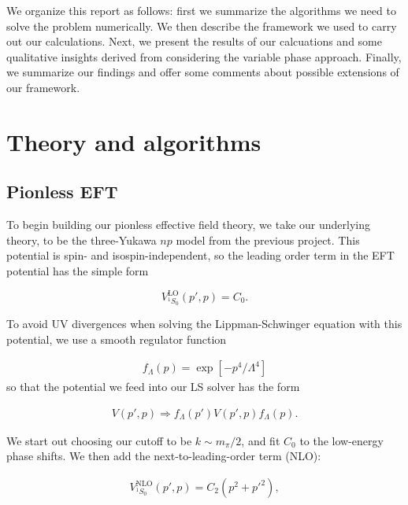 \documentclass[10pt,showpacs,preprintnumbers,footinbib,amsmath,amssymb,aps,prl,twocolumn,groupedaddress,superscriptaddress,showkeys]{revtex4-1}
\begin{document}
We organize this report as follows: first we summarize the algorithms we need to solve the
problem numerically. We then describe the framework we used to carry out our calculations.
Next, we present the results of our calcuations and some qualitative insights derived from
considering the variable phase approach. Finally, we summarize our findings and offer some
comments about possible extensions of our framework.



\section{Theory and algorithms}\label{sec:theory}

\subsection{Pionless EFT}

To begin building our pionless effective field theory, we take our underlying theory, to be
the three-Yukawa $np$ model from the previous project. This potential is spin- and
isospin-independent, so the leading order term in the EFT potential has the simple form

\begin{equation}
	V^\mathrm{LO}_{^1S_0}(p',p)=C_0.
\end{equation}

To avoid UV divergences when solving the Lippman-Schwinger equation with this potential,
we use a smooth regulator function

\begin{equation}
\begin{split}
	f_{\Lambda}(p) = \exp{[-p^4/\Lambda^4]}
\end{split}
\end{equation}
so that the potential we feed into our LS solver has the form


\begin{equation}
\begin{split}
	V(p',p)\Rightarrow f_{\Lambda}(p')V(p',p)f_{\Lambda}(p).
\end{split}
\end{equation} 



We start out choosing our cutoff to be $k\sim m_{\pi}/2$, and fit $C_0$ to the low-energy
phase shifts. We then add the next-to-leading-order term (NLO):

\begin{equation}
\begin{split}
V^\mathrm{NLO}_{^1S_0}(p',p)=C_2(p^2 + p'^2),
\end{split}
\end{equation}
\end{document}
